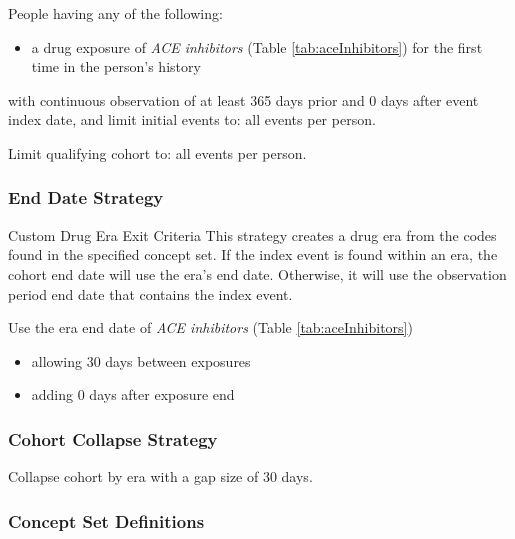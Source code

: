 \documentclass[10.5pt]{book}
\providecommand{\tightlist}{%
  \setlength{\itemsep}{0pt}\setlength{\parskip}{0pt}}
\theoremstyle{definition}
\theoremstyle{definition}
\theoremstyle{definition}
\theoremstyle{remark}
\begin{document}
People having any of the following:

\begin{itemize}
\tightlist
\item
  a drug exposure of \emph{ACE inhibitors} (Table
  \ref{tab:aceInhibitors}) for the first time in the person's history
\end{itemize}

with continuous observation of at least 365 days prior and 0 days after
event index date, and limit initial events to: all events per person.

Limit qualifying cohort to: all events per person.

\subsubsection*{End Date Strategy}\label{end-date-strategy}

Custom Drug Era Exit Criteria This strategy creates a drug era from the
codes found in the specified concept set. If the index event is found
within an era, the cohort end date will use the era's end date.
Otherwise, it will use the observation period end date that contains the
index event.

Use the era end date of \emph{ACE inhibitors} (Table
\ref{tab:aceInhibitors})

\begin{itemize}
\tightlist
\item
  allowing 30 days between exposures
\item
  adding 0 days after exposure end
\end{itemize}

\subsubsection*{Cohort Collapse
Strategy}\label{cohort-collapse-strategy}

Collapse cohort by era with a gap size of 30 days.

\subsubsection*{Concept Set Definitions}\label{concept-set-definitions}
\end{document}

